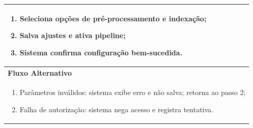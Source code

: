 \begin{description}
\begin{table}[H]
\begin{tabular}{|p{4cm}|p{11cm}|}
{\begin{enumerate}[leftmargin=*]
        \item Seleciona opções de pré-processamento e indexação;
        \item Salva ajustes e ativa pipeline;
        \item Sistema confirma configuração bem-sucedida.
      \end{enumerate}
    } \\ \hline
    \multicolumn{2}{|l|}{\textbf{Fluxo Alternativo}} \\ \hline
    \multicolumn{2}{|p{15cm}|}{%
      \begin{enumerate}[label=\arabic* a\,.]
        \item Parâmetros inválidos: sistema exibe erro e não salva; retorna ao passo 2;
        \item Falha de autorização: sistema nega acesso e registra tentativa.
      \end{enumerate}
    } \\ \hline
  \end{tabular}
\end{table}


\end{description}
